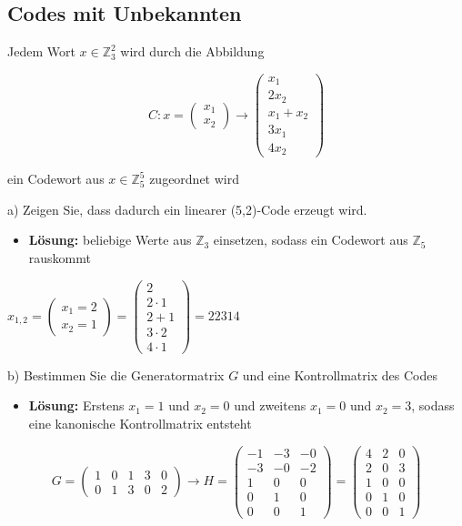 \subsection{Codes mit Unbekannten}

Jedem Wort $x \in \mathbb{Z}_3^2$ wird durch die Abbildung

$$
C : x = \begin{pmatrix}x_1 \\ x_2\end{pmatrix} \rightarrow \begin{pmatrix}x_1\\2x_2\\x_1 + x_2\\3x_1\\4x_2\end{pmatrix}
$$

ein Codewort aus $x \in \mathbb{Z}_5^5$ zugeordnet wird

a) Zeigen Sie, dass dadurch ein linearer (5,2)-Code erzeugt wird.

\begin{itemize}
\item \textbf{Lösung:} beliebige Werte aus $\mathbb{Z}_3$ einsetzen, sodass ein Codewort aus $\mathbb{Z}_5$ rauskommt
\end{itemize}

$x_{1,2} = \begin{pmatrix}x_1 = 2 \\ x_2 = 1\end{pmatrix} = \begin{pmatrix}
2\\
2\cdot1\\
2 + 1\\
3\cdot2\\
4 \cdot 1
\end{pmatrix} = 22314$

b) Bestimmen Sie die Generatormatrix $G$ und eine Kontrollmatrix des Codes

\begin{itemize}
\item \textbf{Lösung:} Erstens $x_1 = 1$ und $x_2 = 0$ und zweitens $x_1 = 0$ und $x_2 = 3$, sodass eine kanonische Kontrollmatrix entsteht
\end{itemize}

$$
G = \begin{pmatrix}
1 & 0 & 1 & 3 & 0\\
0 & 1 & 3 & 0 & 2
\end{pmatrix} \rightarrow H = \begin{pmatrix}
-1 & -3 & -0\\
-3 & -0 & -2\\
1 & 0 & 0\\
0 & 1 & 0\\
0 & 0 & 1
\end{pmatrix} = \begin{pmatrix}
4 & 2 & 0\\
2 & 0 & 3\\
1 & 0 & 0\\
0 & 1 & 0\\
0 & 0 & 1
\end{pmatrix}
$$